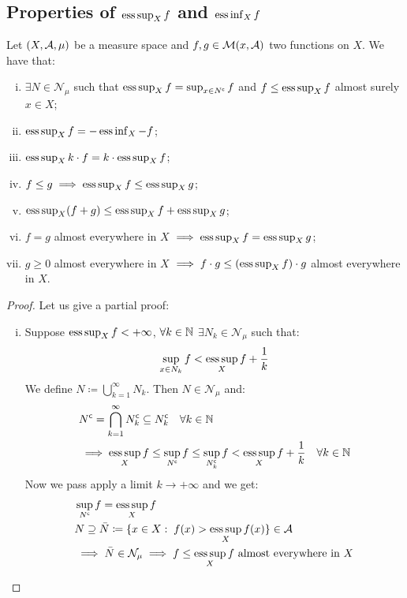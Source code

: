\subsection{Properties of \texorpdfstring{$\operatorname*{ess\,sup}_X f$}{essup f} and \texorpdfstring{$\operatorname*{ess\,inf}_X f$}{essinf f}}
Let $(X, \mathcal{A}, \mu)$ be a measure space and $f,g\in\mathcal{M}(x,\mathcal{A})$ two functions on $X$. We have that:
\begin{enumerate}[i)]
    \item $\exists N \in \mathcal{N}_\mu$ such that $\operatorname*{ess\,sup}_X f = \sup_{x\in N^{\mathsf{c}}} f$ and $f\leq \operatorname*{ess\,sup}_X f$ almost surely $x\in X$;
    \item $\operatorname*{ess\,sup}_X f = -\operatorname*{ess\,inf}_X -f$;
    \item $\operatorname*{ess\,sup}_X k\cdot f  = k \cdot \operatorname*{ess\,sup}_X f$;
    \item $f\leq g \implies \operatorname*{ess\,sup}_X f \leq \operatorname*{ess\,sup}_X g$;
    \item $\operatorname*{ess\,sup}_X (f+g) \leq \operatorname*{ess\,sup}_X f + \operatorname*{ess\,sup}_X g$;
    \item $f = g$ almost everywhere in $X$ $\implies \operatorname*{ess\,sup}_X f = \operatorname*{ess\,sup}_X g$;
    \item $g \geq 0$ almost everywhere in $X$ $\implies f\cdot g \leq (\operatorname*{ess\,sup}_X f)\cdot g$ almost everywhere in $X$.
\end{enumerate}

\begin{proof}
    Let us give a partial proof:
    \begin{enumerate}[i)]
        \item Suppose $\operatorname*{ess\,sup}_X f < +\infty$, $\forall k\in\mathbb{N}$ $\exists N_k \in \mathcal{N}_\mu$ such that:
        \[
            \sup_{x\in N_k} f < \operatorname*{ess\,sup}_X f + \frac{1}{k}
        \]
        We define $N \coloneqq \bigcup_{k=1}^\infty N_k$. Then $N \in \mathcal{N}_\mu$ and:
        \begin{align*}
            &N^{\mathsf{c}} = \bigcap_{k=1}^\infty N^{\mathsf{c}}_k \subseteq N^{\mathsf{c}}_k \quad \forall k \in \mathbb{N} \\
            & \implies  \operatorname*{ess\,sup}_X f \leq \sup_{N^{\mathsf{c}}} f \leq \sup_{N^{\mathsf{c}}_k} f < \operatorname*{ess\,sup}_X f + \frac{1}{k} \quad \forall k \in \mathbb{N}
        \end{align*}
        Now we pass apply a limit $k\to+\infty$ and we get:
        \begin{align*}
            & \sup_{N^{\mathsf{c}}} f = \operatorname*{ess\,sup}_X f \\
            & N \supseteq \bar{N} \coloneqq \{ x\in X: \; f(x) > \operatorname*{ess\,sup}_X f(x) \} \in\mathcal{A} \\
            & \implies \bar{N} \in \mathcal{N}_\mu \implies f \leq \operatorname*{ess\,sup}_X f \text{ almost everywhere in } X
        \end{align*}
    \end{enumerate}
\end{proof}

